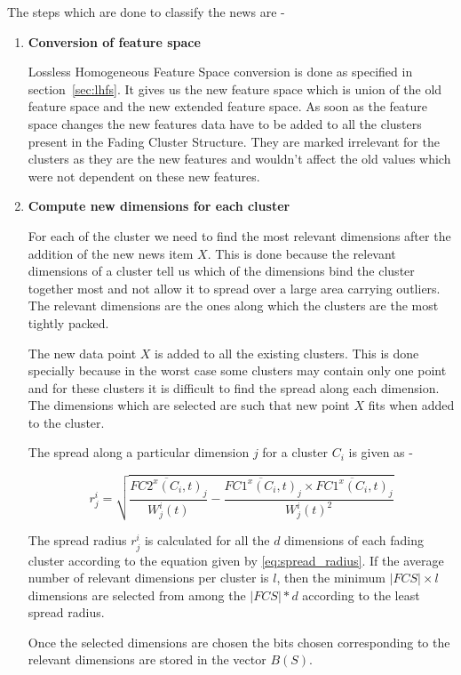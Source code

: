 \documentclass[a4paper,12bp]{report}
\begin{document}
The steps which are done to classify the news are - 
\begin{enumerate}
\item \textbf{Conversion of feature space}

Lossless Homogeneous Feature Space conversion is done as specified in section~\ref{sec:lhfs}. It gives us the new feature space which is union of the old feature space and the new extended feature space. As soon as the feature space changes the new features data have to be added to all the clusters present in the Fading Cluster Structure. They are marked irrelevant for the clusters as they are the new features and wouldn't affect the old values which were not dependent on these new features. 

\item \textbf{Compute new dimensions for each cluster}

For each of the cluster we need to find the most relevant dimensions after the addition of the new news item $X$. This is done because the relevant dimensions of a cluster tell us which of the dimensions bind the cluster together most and not allow it to spread over a large area carrying outliers. The relevant dimensions are the ones along which the clusters are the most tightly packed. 

The new data point $X$ is added to all the existing clusters. This is done specially because in the worst case some clusters may contain only one point and for these clusters it is difficult to find the spread along each dimension. The dimensions which are selected are such that new point $X$ fits when added to the cluster.

The spread along a particular dimension $j$ for a cluster $C_i$ is given as - 

\begin{equation}
\label{eq:spread_radius}
r_j^i = \sqrt{ \frac{\overline{FC2^x(C_i,t)}_j}{W_j^i(t)} - \frac{\overline{FC1^x(C_i,t)}_j \times \overline{FC1^x(C_i,t)}_j}{W_j^i(t)^2}}
\end{equation}

The spread radius $r_j^i$ is calculated for all the $d$ dimensions of each fading cluster according to the equation given by \ref{eq:spread_radius}.
If the average number of relevant dimensions per cluster is $l$, then the minimum $|FCS| \times l$ dimensions are selected from among the $|FCS|*d$ according to the least spread radius. 

Once the selected dimensions are chosen the bits chosen corresponding to the relevant dimensions are stored in the vector $B(S)$.


\end{enumerate}
\end{document}
